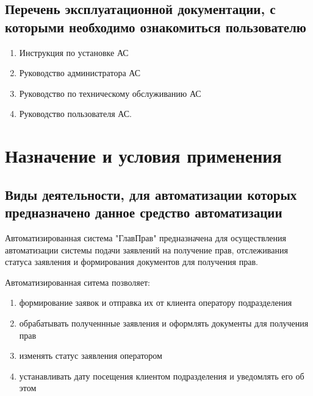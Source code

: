 \documentclass[russian, utf8, 12pt,pointsubsection,floatsubsection]{eskdtext}
\begin{document}
\subsection{Перечень эксплуатационной документации, с которыми необходимо ознакомиться
пользователю}
\begin{enumerate}
    \item Инструкция по установке АС
    \item Руководство администратора АС
    \item Руководство по техническому обслуживанию АС
    \item Руководство пользователя АС.
\end{enumerate}


\section{Назначение и условия применения}

\subsection{Виды деятельности, для автоматизации которых предназначено данное
 средство автоматизации}
 Автоматизированная система "ГлавПрав" предназначена для осуществления автоматизации системы подачи заявлений на получение прав, отслеживания статуса заявления и формирования документов для получения прав.

Автоматизированная ситема позволяет:
\begin{enumerate}
    \item формирование заявок и отправка их от клиента оператору подразделения
    \item обрабатывать полученнные заявления и оформлять документы для получения прав
    \item изменять статус заявления оператором
    \item устанавливать дату посещения клиентом подразделения и уведомлять его об этом
\end{enumerate}
\end{document}
